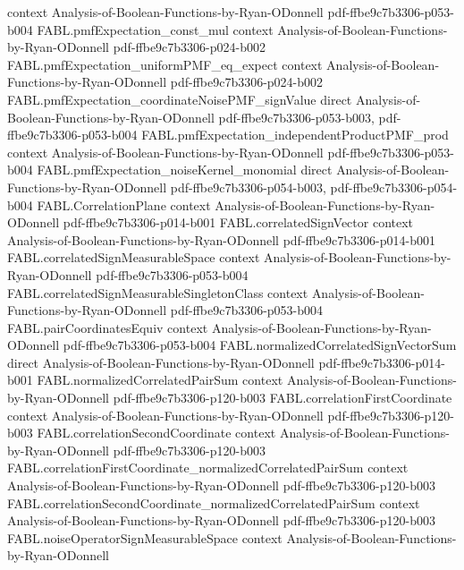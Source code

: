 \begin{theorem}
  {context}
  {Analysis-of-Boolean-Functions-by-Ryan-ODonnell}
  {pdf-ffbe9c7b3306-p053-b004}
\proofstep
  {FABL.pmfExpectation_const_mul}
  {context}
  {Analysis-of-Boolean-Functions-by-Ryan-ODonnell}
  {pdf-ffbe9c7b3306-p024-b002}
\proofstep
  {FABL.pmfExpectation_uniformPMF_eq_expect}
  {context}
  {Analysis-of-Boolean-Functions-by-Ryan-ODonnell}
  {pdf-ffbe9c7b3306-p024-b002}
\proofstep
  {FABL.pmfExpectation_coordinateNoisePMF_signValue}
  {direct}
  {Analysis-of-Boolean-Functions-by-Ryan-ODonnell}
  {pdf-ffbe9c7b3306-p053-b003,
    pdf-ffbe9c7b3306-p053-b004}
\proofstep
  {FABL.pmfExpectation_independentProductPMF_prod}
  {context}
  {Analysis-of-Boolean-Functions-by-Ryan-ODonnell}
  {pdf-ffbe9c7b3306-p053-b004}
\proofstep
  {FABL.pmfExpectation_noiseKernel_monomial}
  {direct}
  {Analysis-of-Boolean-Functions-by-Ryan-ODonnell}
  {pdf-ffbe9c7b3306-p054-b003,
    pdf-ffbe9c7b3306-p054-b004}
\proofstep
  {FABL.CorrelationPlane}
  {context}
  {Analysis-of-Boolean-Functions-by-Ryan-ODonnell}
  {pdf-ffbe9c7b3306-p014-b001}
\proofstep
  {FABL.correlatedSignVector}
  {context}
  {Analysis-of-Boolean-Functions-by-Ryan-ODonnell}
  {pdf-ffbe9c7b3306-p014-b001}
\proofstep
  {FABL.correlatedSignMeasurableSpace}
  {context}
  {Analysis-of-Boolean-Functions-by-Ryan-ODonnell}
  {pdf-ffbe9c7b3306-p053-b004}
\proofstep
  {FABL.correlatedSignMeasurableSingletonClass}
  {context}
  {Analysis-of-Boolean-Functions-by-Ryan-ODonnell}
  {pdf-ffbe9c7b3306-p053-b004}
\proofstep
  {FABL.pairCoordinatesEquiv}
  {context}
  {Analysis-of-Boolean-Functions-by-Ryan-ODonnell}
  {pdf-ffbe9c7b3306-p053-b004}
\proofstep
  {FABL.normalizedCorrelatedSignVectorSum}
  {direct}
  {Analysis-of-Boolean-Functions-by-Ryan-ODonnell}
  {pdf-ffbe9c7b3306-p014-b001}
\proofstep
  {FABL.normalizedCorrelatedPairSum}
  {context}
  {Analysis-of-Boolean-Functions-by-Ryan-ODonnell}
  {pdf-ffbe9c7b3306-p120-b003}
\proofstep
  {FABL.correlationFirstCoordinate}
  {context}
  {Analysis-of-Boolean-Functions-by-Ryan-ODonnell}
  {pdf-ffbe9c7b3306-p120-b003}
\proofstep
  {FABL.correlationSecondCoordinate}
  {context}
  {Analysis-of-Boolean-Functions-by-Ryan-ODonnell}
  {pdf-ffbe9c7b3306-p120-b003}
\proofstep
  {FABL.correlationFirstCoordinate_normalizedCorrelatedPairSum}
  {context}
  {Analysis-of-Boolean-Functions-by-Ryan-ODonnell}
  {pdf-ffbe9c7b3306-p120-b003}
\proofstep
  {FABL.correlationSecondCoordinate_normalizedCorrelatedPairSum}
  {context}
  {Analysis-of-Boolean-Functions-by-Ryan-ODonnell}
  {pdf-ffbe9c7b3306-p120-b003}
\proofstep
  {FABL.noiseOperatorSignMeasurableSpace}
  {context}
  {Analysis-of-Boolean-Functions-by-Ryan-ODonnell}

\end{theorem}
